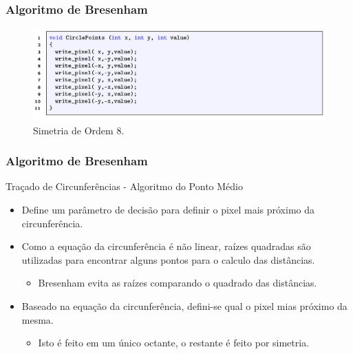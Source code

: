 \documentclass{beamer}
\begin{document}
\begin{frame}
\frametitle{Algoritmo de Bresenham}
	\begin{figure}[!h]
			\begin{center}
			\includegraphics[width=1.0\textwidth]{Figures/Sim8}
			\caption{Simetria de Ordem 8.}
			\end{center}
		\end{figure}
\end{frame}


\begin{frame}
\frametitle{Algoritmo de Bresenham}
		\begin{block}{Traçado de Circunferências - Algoritmo do Ponto Médio}
		\begin{itemize}
			\item Define um parâmetro de decisão para definir o pixel mais próximo da circunferência.
			\item Como a equação da circunferência é não linear, raízes quadradas são utilizadas para encontrar alguns pontos para o calculo das distâncias.
			\begin{itemize}
				\item Bresenham evita as raízes comparando o quadrado das distâncias.
			\end{itemize}
			\item Baseado na equação da circunferência, defini-se qual o pixel mias próximo da mesma.
			\begin{itemize}
				\item Isto é feito em um único octante, o restante é feito por simetria.
\end{itemize}					
		\end{itemize}
	\end{block}
\end{frame}
\end{document}
